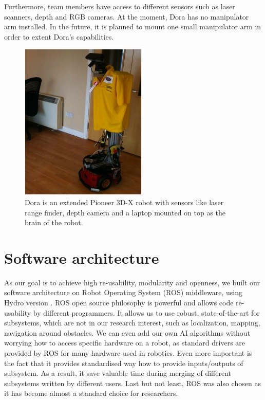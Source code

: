 \documentclass[conference]{IEEEtran}
\begin{document}
Furthermore, team members have access to different sensors such as laser scanners, depth and RGB cameras. At the moment, Dora has no manipulator arm installed. In the future, it is planned to mount one small manipulator arm in order to extent Dora's capabilities.

\begin{figure}[!t]
\centering
\includegraphics[width=3.in]{dorafinal.jpg}
\caption{Dora is an extended Pioneer 3D-X robot with sensors like laser range finder, depth camera and a laptop mounted on top as the brain of the robot.}
\label{fig:dora}
\end{figure}

\section{Software architecture}
As our goal is to achieve high re-usability, modularity and openness, we built our software architecture on Robot Operating System (ROS) middleware, using Hydro version \cite{ros}. ROS open source philosophy is powerful and allows code re-usability by different programmers. It allows us to use robust, state-of-the-art for subsystems, which are not in our research interest, such as localization, mapping, navigation around obstacles. We can even add our own AI algorithms without worrying how to access specific hardware on a robot, as standard drivers are provided by ROS for many hardware used in robotics. Even more important is the fact that it provides standardised way how to provide inputs/outputs of subsystem. As a result, it save valuable time during merging of different subsystems written by different users. Last but not least, ROS was also chosen as it has become almost a standard choice for researchers.
\end{document}
